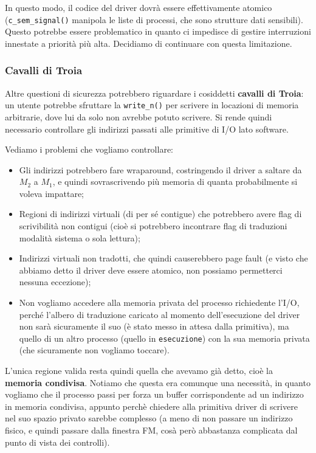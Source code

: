 \documentclass[a4paper,11pt]{article}
\begin{document}
In questo modo, il codice del driver dovrà essere effettivamente atomico (\lstinline|c_sem_signal()| manipola le liste di processi, che sono strutture dati sensibili).
Questo potrebbe essere problematico in quanto ci impedisce di gestire interruzioni innestate a priorità più alta.
Decidiamo di continuare con questa limitazione.

\subsubsection{Cavalli di Troia}
Altre questioni di sicurezza potrebbero riguardare i cosiddetti \textbf{cavalli di Troia}: un utente potrebbe sfruttare la \lstinline|write_n()| per scrivere in locazioni di memoria arbitrarie, dove lui da solo non avrebbe potuto scrivere.
Si rende quindi necessario controllare gli indirizzi passati alle primitive di I/O lato software.

Vediamo i problemi che vogliamo controllare:
\begin{itemize}
	\item Gli indirizzi potrebbero fare wraparound, costringendo il driver a saltare da $M_2$ a $M_1$, e quindi sovrascrivendo più memoria di quanta probabilmente si voleva impattare;
	\item Regioni di indirizzi virtuali (di per sé contigue) che potrebbero avere flag di scrivibilità non contigui (cioè si potrebbero incontrare flag di traduzioni modalità sistema o sola lettura);
	\item Indirizzi virtuali non tradotti, che quindi causerebbero page fault (e visto che abbiamo detto il driver deve essere atomico, non possiamo permetterci nessuna eccezione);
	\item Non vogliamo accedere alla memoria privata del processo richiedente l'I/O, perché l'albero di traduzione caricato al momento dell'esecuzione del driver non sarà sicuramente il suo (è stato messo in attesa dalla primitiva), ma quello di un altro processo (quello in \lstinline|esecuzione|) con la sua memoria privata (che sicuramente non vogliamo toccare). 
\end{itemize}

L'unica regione valida resta quindi quella che avevamo già detto, cioè la \textbf{memoria condivisa}.
Notiamo che questa era comunque una necessità, in quanto vogliamo che il processo passi per forza un buffer corrispondente ad un indirizzo in memoria condivisa, appunto perchè chiedere alla primitiva driver di scrivere nel suo spazio privato sarebbe complesso (a meno di non passare un indirizzo fisico, e quindi passare dalla finestra FM, cosà però abbastanza complicata dal punto di vista dei controlli).
\end{document}
